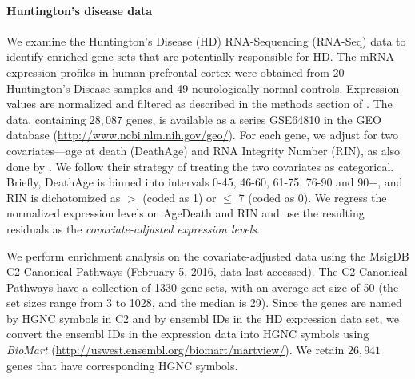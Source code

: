 	\paragraph{Huntington's disease data}
	
	We examine the Huntington's Disease (HD) RNA-Sequencing (RNA-Seq) data 
	\citep{labadorf2015rna} to identify enriched gene sets that are potentially responsible for HD. 
	The mRNA expression profiles in human prefrontal cortex were obtained from 20 Huntington's 
	Disease samples and 49 neurologically normal controls.  Expression values are normalized and 
	filtered as described in the methods section of \citet{labadorf2015rna}. The data, containing 
	$28,087$ genes, is available as a series GSE64810 in the GEO database 
	(\url{http://www.ncbi.nlm.nih.gov/geo/}). For each gene, we adjust for two covariates---age at 
	death (DeathAge) and RNA Integrity Number (RIN), as also done by \citet{labadorf2015rna}. We 
	follow their strategy of treating the two covariates as categorical. Briefly, DeathAge is 
	binned into intervals 0-45, 46-60, 61-75, 76-90 and	90+, and RIN is dichotomized as  $>$ (coded 
	as 1) or $\leq$ 7 (coded as 0). We regress the normalized expression levels on AgeDeath and RIN 
	and use the resulting 
	residuals as the \textit{covariate-adjusted expression levels}.
	
	We perform enrichment analysis on the covariate-adjusted data using the MsigDB
	\citep{subramanian2005gene} C2 Canonical Pathways (February 5, 2016, data last accessed).
	The C2 Canonical Pathways have a collection of 1330 gene sets, with an average set size of
	50 (the set sizes range from 3 to 1028, and the median is 29). Since the genes are named by
	HGNC symbols in C2 and by ensembl IDs in the HD expression data set, we convert the ensembl 
	IDs in 	the expression data into HGNC symbols using \textit{BioMart}
	(\url{http://uswest.ensembl.org/biomart/martview/}). We retain $26,941$ genes that have
	corresponding HGNC symbols. 
	
	
	
